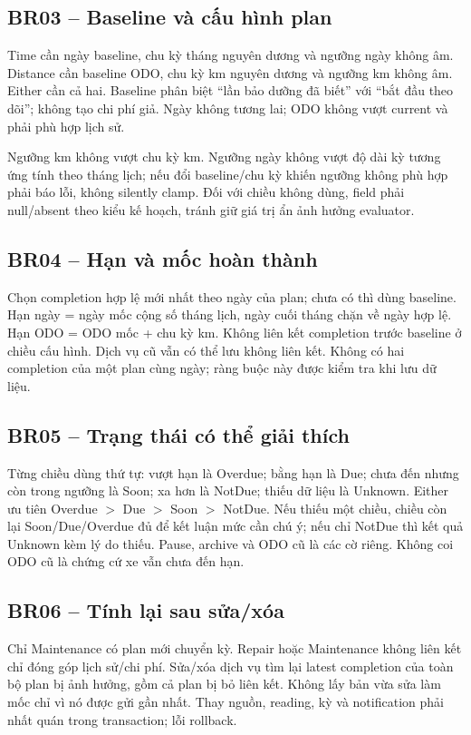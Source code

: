 \subsection{BR03 -- Baseline và cấu hình plan}
Time cần ngày baseline, chu kỳ tháng nguyên dương và ngưỡng ngày không âm. Distance cần baseline ODO, chu kỳ km nguyên dương và ngưỡng km không âm. Either cần cả hai. Baseline phân biệt ``lần bảo dưỡng đã biết'' với ``bắt đầu theo dõi''; không tạo chi phí giả. Ngày không tương lai; ODO không vượt current và phải phù hợp lịch sử.

Ngưỡng km không vượt chu kỳ km. Ngưỡng ngày không vượt độ dài kỳ tương ứng tính theo tháng lịch; nếu đổi baseline/chu kỳ khiến ngưỡng không phù hợp phải báo lỗi, không silently clamp. Đối với chiều không dùng, field phải null/absent theo kiểu kế hoạch, tránh giữ giá trị ẩn ảnh hưởng evaluator.
\subsection{BR04 -- Hạn và mốc hoàn thành}
Chọn completion hợp lệ mới nhất theo ngày của plan; chưa có thì dùng baseline. Hạn ngày = ngày mốc cộng số tháng lịch, ngày cuối tháng chặn về ngày hợp lệ. Hạn ODO = ODO mốc + chu kỳ km. Không liên kết completion trước baseline ở chiều cấu hình. Dịch vụ cũ vẫn có thể lưu không liên kết. Không có hai completion của một plan cùng ngày; ràng buộc này được kiểm tra khi lưu dữ liệu.
\subsection{BR05 -- Trạng thái có thể giải thích}
Từng chiều dùng thứ tự: vượt hạn là Overdue; bằng hạn là Due; chưa đến nhưng còn trong ngưỡng là Soon; xa hơn là NotDue; thiếu dữ liệu là Unknown. Either ưu tiên Overdue $>$ Due $>$ Soon $>$ NotDue. Nếu thiếu một chiều, chiều còn lại Soon/Due/Overdue đủ để kết luận mức cần chú ý; nếu chỉ NotDue thì kết quả Unknown kèm lý do thiếu. Pause, archive và ODO cũ là các cờ riêng. Không coi ODO cũ là chứng cứ xe vẫn chưa đến hạn.
\subsection{BR06 -- Tính lại sau sửa/xóa}
Chỉ Maintenance có plan mới chuyển kỳ. Repair hoặc Maintenance không liên kết chỉ đóng góp lịch sử/chi phí. Sửa/xóa dịch vụ tìm lại latest completion của toàn bộ plan bị ảnh hưởng, gồm cả plan bị bỏ liên kết. Không lấy bản vừa sửa làm mốc chỉ vì nó được gửi gần nhất. Thay nguồn, reading, kỳ và notification phải nhất quán trong transaction; lỗi rollback.
